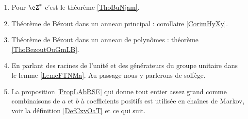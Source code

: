 

    \begin{enumerate}
        \item
            Pour \( \eZ^*\) c'est le théorème \ref{ThoBuNjam}.
        \item
            Théorème de Bézout dans un anneau principal : corollaire \ref{CorimHyXy}.
        \item
            Théorème de Bézout dans un anneau de polynômes : théorème \ref{ThoBezoutOuGmLB}.
        \item
            En parlant des racines de l'unité et des générateurs du groupe unitaire dans le lemme \ref{LemcFTNMa}. Au passage nous y parlerons de solfège.
        \item
            La proposition \ref{PropLAbRSE} qui donne tout entier assez grand comme combinaisons de \( a \) et \( b\) à coefficients positifs est utilisée en chaînes de Markov, voir la définition \ref{DefCxvOaT} et ce qui suit.
        \end{enumerate}

